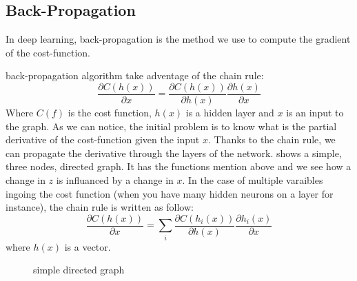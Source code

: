 	\subsection{Back-Propagation}
		In deep learning, back-propagation is the method we use to compute the gradient of the cost-function.

		back-propagation algorithm take adventage of the chain rule:
		\begin{equation}
			\frac{\partial C(h(x))}{\partial x} = \frac{\partial C(h(x))}{\partial h(x)} \frac{\partial h(x)}{\partial x}
		\end{equation}
		Where $C(f)$ is the cost function, $h(x)$ is a hidden layer and $x$ is an input to the graph. As we can notice, the initial problem is to know what is the partial derivative of the cost-function given the input $x$. Thanks to the chain rule, we can propagate the derivative through the layers of the network.  shows a simple, three nodes, directed graph. It has the functions mention above and we see how a change in $z$ is influanced by a change in $x$. In the case of multiple varaibles ingoing the cost function (when you have many hidden neurons on a layer for instance), the chain rule is written as follow:
		\begin{equation}
			\frac{\partial C(h(x))}{\partial x} = \sum_i\frac{\partial C(h_i(x))}{\partial h(x)} \frac{\partial h_i(x)}{\partial x}
		\end{equation}
		where $h(x)$ is a vector.


		\usetikzlibrary{calc,trees,positioning,arrows,chains,shapes.geometric,%
		decorations.pathreplacing,decorations.pathmorphing,shapes,%
		matrix,shapes.symbols}


		\begin{figure}
			\centering
			\caption{simple directed graph}
			\label{fig:back_prop1}
		\end{figure}


